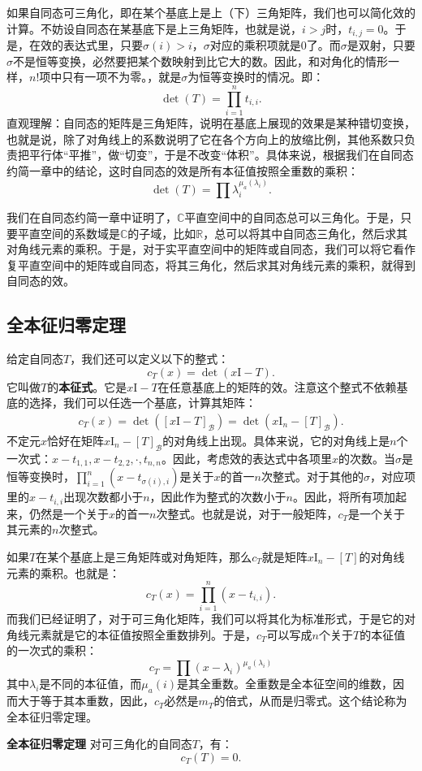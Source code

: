 \documentclass[12pt,UTF8]{ctexbook}
\begin{document}
如果自同态可三角化，即在某个基底上是上（下）三角矩阵，我们也可以简化效的计算。不妨设自同态在某基底下是上三角矩阵，也就是说，$i>j$时，$t_{i,j} = 0$。于是，在效的表达式里，只要$\sigma(i) > i$，$\sigma$对应的乘积项就是$0$了。而$\sigma$是双射，只要$\sigma$不是恒等变换，必然要把某个数映射到比它大的数。因此，和对角化的情形一样，$n!$项中只有一项不为零。，就是$\sigma$为恒等变换时的情况。即：
$$
\det(T) = \prod_{i=1}^n t_{i,i}.
$$
直观理解：自同态的矩阵是三角矩阵，说明在基底上展现的效果是某种错切变换，也就是说，除了对角线上的系数说明了它在各个方向上的放缩比例，其他系数只负责把平行体“平推”，做“切变”，于是不改变“体积”。具体来说，根据我们在自同态约简一章中的结论，这时自同态的效是所有本征值按照全重数的乘积：
$$
\det(T) = \prod\lambda_i^{\mu_a(\lambda_i)}.
$$

我们在自同态约简一章中证明了，$\mathbb{C}$平直空间中的自同态总可以三角化。于是，只要平直空间的系数域是$\mathbb{C}$的子域，比如$\mathbf{\mathbb{R}}$，总可以将其中自同态三角化，然后求其对角线元素的乘积。于是，对于实平直空间中的矩阵或自同态，我们可以将它看作复平直空间中的矩阵或自同态，将其三角化，然后求其对角线元素的乘积，就得到自同态的效。

\subsection{全本征归零定理}
给定自同态$T$，我们还可以定义以下的整式：
$$
c_T(x) = \det(x \mathrm{I} - T).
$$
它叫做$T$的\textbf{本征式}。它是$x \mathrm{I} - T$在任意基底上的矩阵的效。注意这个整式不依赖基底的选择，我们可以任选一个基底，计算其矩阵：
\begin{align*}
    c_T(x) = \det([x \mathrm{I} - T]_{\mathcal{B}}) = \det(x\mathrm{I}_n - [T]_{\mathcal{B}}).
\end{align*}
不定元$x$恰好在矩阵$x\mathrm{I}_n - [T]_{\mathcal{B}}$的对角线上出现。具体来说，它的对角线上是$n$个一次式：$x - t_{1,1}, x - t_{2,2}, \cdot, t_{n, n}$。因此，考虑效的表达式中各项里$x$的次数。当$\sigma$是恒等变换时，$\prod_{i=1}^n (x - t_{\sigma(i),i})$是关于$x$的首一$n$次整式。对于其他的$\sigma$，对应项里的$x - t_{i,i}$出现次数都小于$n$，因此作为整式的次数小于$n$。因此，将所有项加起来，仍然是一个关于$x$的首一$n$次整式。也就是说，对于一般矩阵，$c_T$是一个关于其元素的$n$次整式。

如果$T$在某个基底上是三角矩阵或对角矩阵，那么$c_T$就是矩阵$x\mathrm{I}_n - [T]$的对角线元素的乘积。也就是：
$$
c_T(x) = \prod_{i=1}^n (x - t_{i,i}).
$$
而我们已经证明了，对于可三角化矩阵，我们可以将其化为标准形式，于是它的对角线元素就是它的本征值按照全重数排列。于是，$c_T$可以写成$n$个关于$T$的本征值的一次式的乘积：
$$
c_T = \prod (x - \lambda_i)^{\mu_a(\lambda_i)}
$$
其中$\lambda_i$是不同的本征值，而$\mu_a(i)$是其全重数。全重数是全本征空间的维数，因而大于等于其本重数，因此，$c_T$必然是$m_T$的倍式，从而是归零式。这个结论称为全本征归零定理。
\begin{tm}{\textbf{全本征归零定理}}
    对可三角化的自同态$T$，有：
    $$ c_T(T) = 0. $$
\end{tm}
\end{document}
